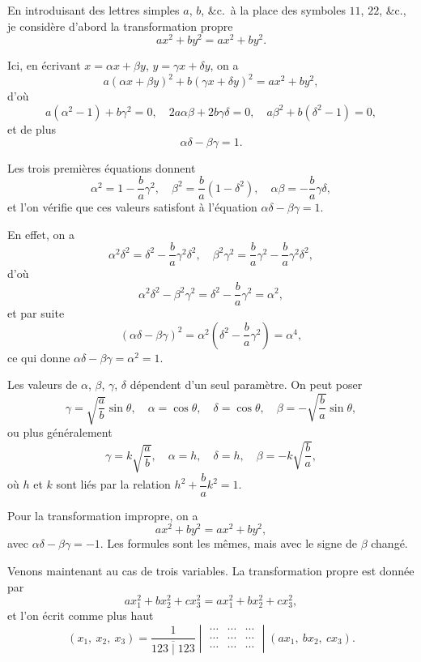 \documentclass[11pt,a4paper]{book}
\begin{document}
En introduisant des lettres simples $a$, $b$, \&c.\ \`{a} la place des symboles $11$, $22$, \&c., je consid\`{e}re d'abord la transformation propre
\[
ax^2 + by^2 = ax^2 + by^2.
\]

Ici, en \'{e}crivant $x = \alpha x + \beta y$, $y = \gamma x + \delta y$, on a
\[
a(\alpha x + \beta y)^2 + b(\gamma x + \delta y)^2 = ax^2 + by^2,
\]
d'o\`{u}
\[
a(\alpha^2 - 1) + b\gamma^2 = 0,\quad
2a\alpha\beta + 2b\gamma\delta = 0,\quad
a\beta^2 + b(\delta^2 - 1) = 0,
\]
et de plus
\[
\alpha\delta - \beta\gamma = 1.
\]

Les trois premi\`{e}res \'{e}quations donnent
\[
\alpha^2 = 1 - \frac{b}{a}\gamma^2,\quad
\beta^2 = \frac{b}{a}(1 - \delta^2),\quad
\alpha\beta = -\frac{b}{a}\gamma\delta,
\]
et l'on v\'{e}rifie que ces valeurs satisfont \`{a} l'\'{e}quation $\alpha\delta - \beta\gamma = 1$.

\newpage
\setcounter{page}{211}

En effet, on a
\[
\alpha^2 \delta^2 = \delta^2 - \frac{b}{a}\gamma^2\delta^2,\quad
\beta^2 \gamma^2 = \frac{b}{a}\gamma^2 - \frac{b}{a}\gamma^2\delta^2,
\]
d'o\`{u}
\[
\alpha^2\delta^2 - \beta^2\gamma^2 = \delta^2 - \frac{b}{a}\gamma^2 = \alpha^2,
\]
et par suite
\[
(\alpha\delta - \beta\gamma)^2 = \alpha^2(\delta^2 - \frac{b}{a}\gamma^2) = \alpha^4,
\]
ce qui donne $\alpha\delta - \beta\gamma = \alpha^2 = 1$.

Les valeurs de $\alpha$, $\beta$, $\gamma$, $\delta$ d\'{e}pendent d'un seul param\`{e}tre. On peut poser
\[
\gamma = \sqrt{\frac{a}{b}}\sin\theta,\quad
\alpha = \cos\theta,\quad
\delta = \cos\theta,\quad
\beta = -\sqrt{\frac{b}{a}}\sin\theta,
\]
ou plus g\'{e}n\'{e}ralement
\[
\gamma = k\sqrt{\frac{a}{b}},\quad
\alpha = h,\quad
\delta = h,\quad
\beta = -k\sqrt{\frac{b}{a}},
\]
o\`{u} $h$ et $k$ sont li\'{e}s par la relation $h^2 + \dfrac{b}{a}k^2 = 1$.

Pour la transformation impropre, on a
\[
ax^2 + by^2 = ax^2 + by^2,
\]
avec $\alpha\delta - \beta\gamma = -1$. Les formules sont les m\^{e}mes, mais avec le signe de $\beta$ chang\'{e}.

Venons maintenant au cas de trois variables. La transformation propre est donn\'{e}e par
\[
ax_1^2 + bx_2^2 + cx_3^2 = ax_1^2 + bx_2^2 + cx_3^2,
\]
et l'on \'{e}crit comme plus haut
\[
(x_1,\ x_2,\ x_3) = \frac{1}{\overline{123 \mid 123}}
\begin{vmatrix}
\cdots & \cdots & \cdots \\
\cdots & \cdots & \cdots \\
\cdots & \cdots & \cdots
\end{vmatrix}
(ax_1,\ bx_2,\ cx_3).
\]
\end{document}
